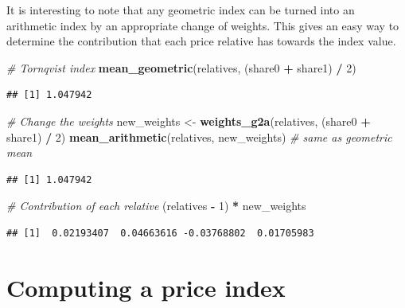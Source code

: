 \documentclass[]{article}
\newenvironment{Shaded}{\begin{snugshade}}{\end{snugshade}}
\newcommand{\CommentTok}[1]{\textcolor[rgb]{0.56,0.35,0.01}{\textit{#1}}}
\newcommand{\DecValTok}[1]{\textcolor[rgb]{0.00,0.00,0.81}{#1}}
\newcommand{\KeywordTok}[1]{\textcolor[rgb]{0.13,0.29,0.53}{\textbf{#1}}}
\newcommand{\NormalTok}[1]{#1}
\newcommand{\OperatorTok}[1]{\textcolor[rgb]{0.81,0.36,0.00}{\textbf{#1}}}
\newcommand{\StringTok}[1]{\textcolor[rgb]{0.31,0.60,0.02}{#1}}
\begin{document}
It is interesting to note that any geometric index can be turned into an arithmetic index by an appropriate change of weights. This gives an easy way to determine the contribution that each price relative has towards the index value.

\begin{Shaded}
\begin{Highlighting}[]
\CommentTok{# Tornqvist index}
\KeywordTok{mean_geometric}\NormalTok{(relatives, (share0 }\OperatorTok{+}\StringTok{ }\NormalTok{share1) }\OperatorTok{/}\StringTok{ }\DecValTok{2}\NormalTok{) }
\end{Highlighting}
\end{Shaded}

\begin{verbatim}
## [1] 1.047942
\end{verbatim}

\begin{Shaded}
\begin{Highlighting}[]
\CommentTok{# Change the weights}
\NormalTok{new_weights <-}\StringTok{ }\KeywordTok{weights_g2a}\NormalTok{(relatives, (share0 }\OperatorTok{+}\StringTok{ }\NormalTok{share1) }\OperatorTok{/}\StringTok{ }\DecValTok{2}\NormalTok{)}
\KeywordTok{mean_arithmetic}\NormalTok{(relatives, new_weights) }\CommentTok{# same as geometric mean}
\end{Highlighting}
\end{Shaded}

\begin{verbatim}
## [1] 1.047942
\end{verbatim}

\begin{Shaded}
\begin{Highlighting}[]
\CommentTok{# Contribution of each relative}
\NormalTok{(relatives }\OperatorTok{-}\StringTok{ }\DecValTok{1}\NormalTok{) }\OperatorTok{*}\StringTok{ }\NormalTok{new_weights}
\end{Highlighting}
\end{Shaded}

\begin{verbatim}
## [1]  0.02193407  0.04663616 -0.03768802  0.01705983
\end{verbatim}

\hypertarget{computing-a-price-index}{%
\section{Computing a price index}\label{computing-a-price-index}}
\end{document}

